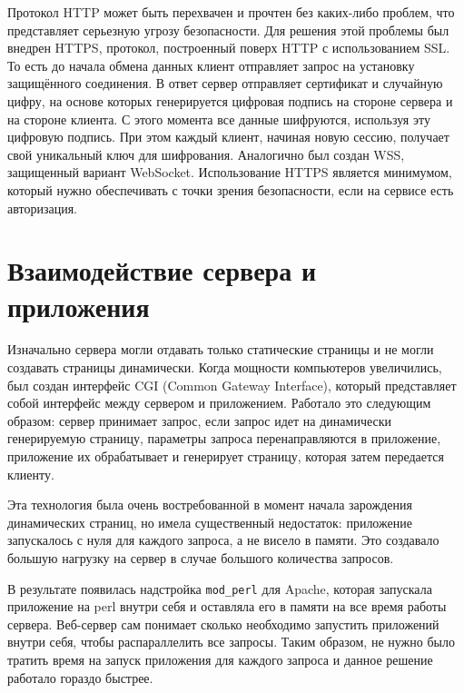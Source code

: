 Протокол HTTP может быть перехвачен и прочтен без каких-либо проблем, что представляет серьезную угрозу безопасности. Для решения этой проблемы был внедрен HTTPS, протокол, построенный поверх HTTP с использованием SSL. То есть до начала обмена данных клиент отправляет запрос на установку защищённого соединения. В ответ сервер отправляет сертификат и случайную цифру, на основе которых генерируется цифровая подпись на стороне сервера и на стороне клиента. С этого момента все данные шифруются, используя эту цифровую подпись. При этом каждый клиент, начиная новую сессию, получает свой уникальный ключ для шифрования. Аналогично был создан WSS, защищенный вариант WebSocket. Использование HTTPS является минимумом, который нужно обеспечивать с точки зрения безопасности, если на сервисе есть авторизация.

\section{Взаимодействие сервера и приложения} %
Изначально сервера могли отдавать только статические страницы и не могли создавать страницы динамически. Когда мощности компьютеров увеличились, был создан интерфейс CGI (Common Gateway Interface), который представляет собой интерфейс между сервером и приложением. Работало это следующим образом: сервер принимает запрос, если запрос идет на динамически генерируемую страницу, параметры запроса перенаправляются в приложение, приложение их обрабатывает и генерирует страницу, которая затем передается клиенту.

Эта технология была очень востребованной в момент начала зарождения динамических страниц, но имела существенный недостаток: приложение запускалось с нуля для каждого запроса, а не висело в памяти. Это создавало большую нагрузку на сервер в случае большого количества запросов.

В результате появилась надстройка \verb|mod_perl| для Apache, которая запускала приложение на perl внутри себя и оставляла его в памяти на все время работы сервера. Веб-сервер сам понимает сколько необходимо запустить приложений внутри себя, чтобы распараллелить все запросы. Таким образом, не нужно было тратить время на запуск приложения для каждого запроса и данное решение работало гораздо быстрее.

